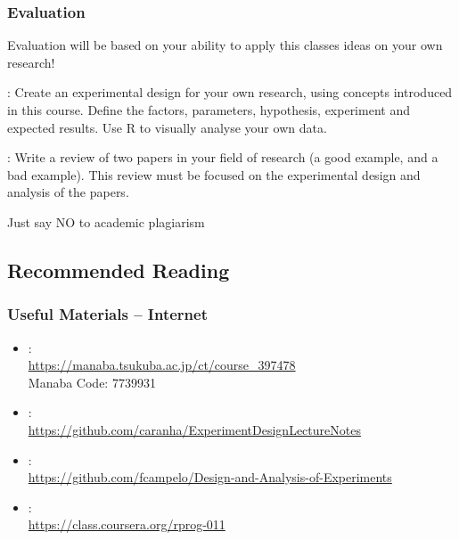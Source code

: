 \documentclass{beamer}
\begin{document}
\begin{frame}
  \frametitle{Evaluation} 

  Evaluation will be based on your ability to apply this classes ideas
  on your own research!

  \begin{description}
    {\small
  \item[Main Report]: Create an experimental design for your own
    research, using concepts introduced in this course. Define the
    factors, parameters, hypothesis, experiment and expected
    results. Use R to visually analyse your own data.

    \bigskip

  \item[Report on Good/Bad Science]: Write a review of two papers in
    your field of research (a good example, and a bad example). This
    review must be focused on the experimental design and analysis of
    the papers.  }
  \end{description}
  \vfill
  \begin{block}{}
    \begin{center}
      \alert{Just say NO to academic plagiarism}
    \end{center}
  \end{block}
\end{frame}


\subsection{Recommended Reading}
\begin{frame}
  \frametitle{Useful Materials -- Internet}
  
  \begin{itemize}
  \item {}:\\\url{https://manaba.tsukuba.ac.jp/ct/course_397478}\\ Manaba
    Code: 7739931
  \item {}:\\\url{https://github.com/caranha/ExperimentDesignLectureNotes}
  \item {}:\\\url{https://github.com/fcampelo/Design-and-Analysis-of-Experiments}
  \item {}:\\\url{https://class.coursera.org/rprog-011}
  \end{itemize}
\end{frame}
\end{document}
